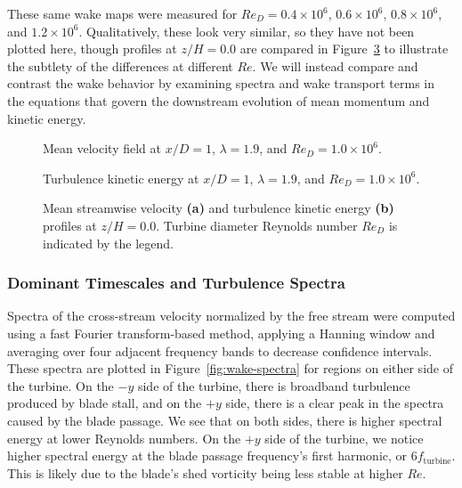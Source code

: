 These same wake maps were measured for $Re_D = 0.4 \times 10^6$, $0.6 \times
10^6$, $0.8 \times 10^6$, and $1.2 \times 10^6$. Qualitatively, these look very
similar, so they have not been plotted here, though profiles at $z/H=0.0$ are
compared in Figure~\ref{fig:profiles} to illustrate the subtlety of the
differences at different $Re$. We will instead compare and contrast the wake
behavior by examining spectra and wake transport terms in the equations that
govern the downstream evolution of mean momentum and kinetic energy.

\begin{figure}[ht]
\centering


\caption{Mean velocity field at $x/D=1$, $\lambda=1.9$, and $Re_D=1.0 \times
    10^6$.}

\label{fig:meancontquiv}
\end{figure}
\unskip

\begin{figure}[ht]
\centering


\caption{Turbulence kinetic energy at $x/D=1$, $\lambda=1.9$, and $Re_D=1.0
    \times 10^6$.}

\label{fig:kcont}
\end{figure}
\unskip

\begin{figure}[ht]
\centering


\caption{Mean streamwise velocity \textbf{(a)} and turbulence kinetic energy
    \textbf{(b)} profiles at $z/H=0.0$. Turbine diameter Reynolds number $Re_D$ is
    indicated by the legend.}

\label{fig:profiles}
\end{figure}


\subsubsection{Dominant Timescales and Turbulence Spectra}

Spectra of the cross-stream velocity normalized by the free stream were computed
using a fast Fourier transform-based method, applying a Hanning window and
averaging over four adjacent frequency bands to decrease confidence intervals.
These spectra are plotted in Figure~\ref{fig:wake-spectra} for regions on either
side of the turbine. On the $-y$ side of the turbine, there is broadband
turbulence produced by blade stall, and on the $+y$ side, there is a clear peak
in the spectra caused by the blade passage. We see that on both sides, there is
higher spectral energy at lower Reynolds numbers. On the $+y$ side of the
turbine, we notice higher spectral energy at the blade passage frequency's first
harmonic, or $6 f_\mathrm{turbine}$. This is likely due to the blade's shed
vorticity being less stable at higher $Re$.

